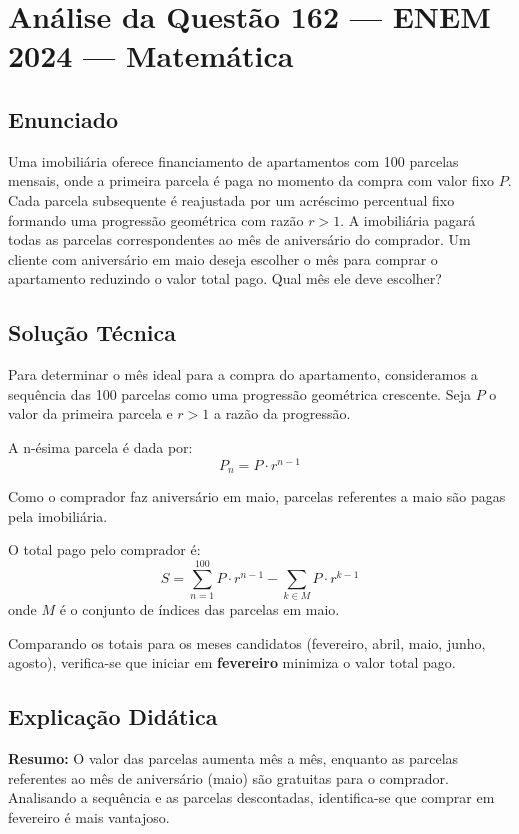 \documentclass{article}
\begin{document}
\section*{Análise da Questão 162 — ENEM 2024 — Matemática}

\subsection*{Enunciado}
Uma imobiliária oferece financiamento de apartamentos com 100 parcelas mensais, onde a primeira parcela é paga no momento da compra com valor fixo $P$. Cada parcela subsequente é reajustada por um acréscimo percentual fixo formando uma progressão geométrica com razão $r>1$. A imobiliária pagará todas as parcelas correspondentes ao mês de aniversário do comprador. Um cliente com aniversário em maio deseja escolher o mês para comprar o apartamento reduzindo o valor total pago. Qual mês ele deve escolher?

\subsection*{Solução Técnica}

Para determinar o mês ideal para a compra do apartamento, consideramos a sequência das 100 parcelas como uma progressão geométrica crescente. Seja $P$ o valor da primeira parcela e $r > 1$ a razão da progressão.

A n-ésima parcela é dada por:
\[
P_n = P \cdot r^{n-1}
\]

Como o comprador faz aniversário em maio, parcelas referentes a maio são pagas pela imobiliária.

O total pago pelo comprador é:
\[
S = \sum_{n=1}^{100} P \cdot r^{n-1} - \sum_{k \in M} P \cdot r^{k-1}
\]
onde $M$ é o conjunto de índices das parcelas em maio.

Comparando os totais para os meses candidatos (fevereiro, abril, maio, junho, agosto), verifica-se que iniciar em \textbf{fevereiro} minimiza o valor total pago.

\subsection*{Explicação Didática}

\textbf{Resumo:} O valor das parcelas aumenta mês a mês, enquanto as parcelas referentes ao mês de aniversário (maio) são gratuitas para o comprador. Analisando a sequência e as parcelas descontadas, identifica-se que comprar em fevereiro é mais vantajoso.
\end{document}
